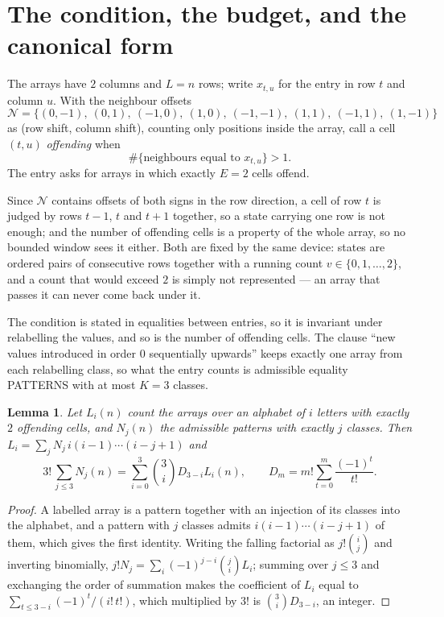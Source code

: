 \documentclass[11pt,a4paper]{article}
\theoremstyle{plain}
\newtheorem{lemma}[theorem]{Lemma}
\theoremstyle{definition}
\begin{document}
\section{The condition, the budget, and the canonical form}

The arrays have $2$ columns and $L=n$ rows; write $x_{t,u}$ for the entry in
row $t$ and column $u$. With the neighbour offsets
\[
\mathcal N=\{(0,-1),\ (0,1),\ (-1,0),\ (1,0),\ (-1,-1),\ (1,1),\ (-1,1),\ (1,-1)\}
\]
as (row shift, column shift), counting only positions inside the array, call a cell
$(t,u)$ \emph{offending} when
\[
\#\{\text{neighbours equal to }x_{t,u}\}>1 .
\]
The entry asks for arrays in which exactly $E=2$ cells offend.

Since $\mathcal N$ contains offsets of both signs in the row direction, a cell of row
$t$ is judged by rows $t-1$, $t$ and $t+1$ together, so a state carrying one row is not
enough; and the number of offending cells is a property of the whole array, so no bounded
window sees it either. Both are fixed by the same device: states are ordered pairs of
consecutive rows together with a running count $v\in\{0,1,\dots,2\}$, and a count that
would exceed $2$ is simply not represented --- an array that passes it can never come back
under it.

The condition is stated in equalities between entries, so it is invariant under relabelling
the values, and so is the number of offending cells. The clause ``new values introduced in
order $0$ sequentially upwards'' keeps exactly one array from each relabelling class, so what
the entry counts is admissible equality PATTERNS with at most $K=3$ classes.

\begin{lemma}\label{lem:inv}
Let $L_i(n)$ count the arrays over an alphabet of $i$ letters with exactly $2$ offending
cells, and $N_j(n)$ the admissible patterns with exactly $j$ classes. Then
$L_i=\sum_j N_j\,i(i-1)\cdots(i-j+1)$ and
\[
3!\,\sum_{j\le3}N_j(n)=\sum_{i=0}^{3}\binom{3}{i}D_{3-i}L_i(n),
\qquad D_m=m!\sum_{t=0}^{m}\frac{(-1)^t}{t!} .
\]
\end{lemma}

\begin{proof}
A labelled array is a pattern together with an injection of its classes into the alphabet,
and a pattern with $j$ classes admits $i(i-1)\cdots(i-j+1)$ of them, which gives the first
identity. Writing the falling factorial as $j!\binom{i}{j}$ and inverting binomially,
$j!N_j=\sum_i(-1)^{j-i}\binom{j}{i}L_i$; summing over $j\le3$ and exchanging the
order of summation makes the coefficient of $L_i$ equal to
$\sum_{t\le3-i}(-1)^t/(i!\,t!)$, which multiplied by $3!$ is
$\binom{3}{i}D_{3-i}$, an integer.
\end{proof}
\end{document}
